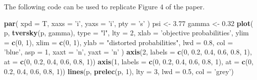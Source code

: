 \documentclass[
]{article}
\newenvironment{Shaded}{\begin{snugshade}}{\end{snugshade}}
\newcommand{\DataTypeTok}[1]{\textcolor[rgb]{0.13,0.29,0.53}{#1}}
\newcommand{\DecValTok}[1]{\textcolor[rgb]{0.00,0.00,0.81}{#1}}
\newcommand{\FloatTok}[1]{\textcolor[rgb]{0.00,0.00,0.81}{#1}}
\newcommand{\KeywordTok}[1]{\textcolor[rgb]{0.13,0.29,0.53}{\textbf{#1}}}
\newcommand{\NormalTok}[1]{#1}
\newcommand{\StringTok}[1]{\textcolor[rgb]{0.31,0.60,0.02}{#1}}
\begin{document}
The following code can be used to replicate Figure 4 of the paper.

\begin{Shaded}
\begin{Highlighting}[]
\KeywordTok{par}\NormalTok{(}
  \DataTypeTok{xpd =}\NormalTok{ T,}
  \DataTypeTok{xaxs =} \StringTok{'i'}\NormalTok{,}
  \DataTypeTok{yaxs =} \StringTok{'i'}\NormalTok{,}
  \DataTypeTok{pty =} \StringTok{'s'}
\NormalTok{)}
\NormalTok{psi <-}\StringTok{ }\FloatTok{3.77}
\NormalTok{gamma <-}\StringTok{ }\FloatTok{0.32}
\KeywordTok{plot}\NormalTok{(}
\NormalTok{  p,}
  \KeywordTok{tversky}\NormalTok{(p, gamma),}
  \DataTypeTok{type =} \StringTok{"l"}\NormalTok{,}
  \DataTypeTok{lty =} \DecValTok{2}\NormalTok{,}
  \DataTypeTok{xlab =} \StringTok{'objective probabilities'}\NormalTok{,}
  \DataTypeTok{ylim =} \KeywordTok{c}\NormalTok{(}\DecValTok{0}\NormalTok{, }\DecValTok{1}\NormalTok{),}
  \DataTypeTok{xlim =} \KeywordTok{c}\NormalTok{(}\DecValTok{0}\NormalTok{, }\DecValTok{1}\NormalTok{),}
  \DataTypeTok{ylab =} \StringTok{"distorted probabilities"}\NormalTok{,}
  \DataTypeTok{lwd =} \FloatTok{0.8}\NormalTok{,}
  \DataTypeTok{col =} \StringTok{'blue'}\NormalTok{,}
  \DataTypeTok{asp =} \DecValTok{1}\NormalTok{,}
  \DataTypeTok{xaxt =} \StringTok{'n'}\NormalTok{,}
  \DataTypeTok{yaxt =} \StringTok{'n'}
\NormalTok{)}
\KeywordTok{axis}\NormalTok{(}\DecValTok{2}\NormalTok{,}
     \DataTypeTok{labels =} \KeywordTok{c}\NormalTok{(}\DecValTok{0}\NormalTok{, }\FloatTok{0.2}\NormalTok{, }\FloatTok{0.4}\NormalTok{, }\FloatTok{0.6}\NormalTok{, }\FloatTok{0.8}\NormalTok{, }\DecValTok{1}\NormalTok{),}
     \DataTypeTok{at =} \KeywordTok{c}\NormalTok{(}\DecValTok{0}\NormalTok{, }\FloatTok{0.2}\NormalTok{, }\FloatTok{0.4}\NormalTok{, }\FloatTok{0.6}\NormalTok{, }\FloatTok{0.8}\NormalTok{, }\DecValTok{1}\NormalTok{))}
\KeywordTok{axis}\NormalTok{(}\DecValTok{1}\NormalTok{,}
     \DataTypeTok{labels =} \KeywordTok{c}\NormalTok{(}\DecValTok{0}\NormalTok{, }\FloatTok{0.2}\NormalTok{, }\FloatTok{0.4}\NormalTok{, }\FloatTok{0.6}\NormalTok{, }\FloatTok{0.8}\NormalTok{, }\DecValTok{1}\NormalTok{),}
     \DataTypeTok{at =} \KeywordTok{c}\NormalTok{(}\DecValTok{0}\NormalTok{, }\FloatTok{0.2}\NormalTok{, }\FloatTok{0.4}\NormalTok{, }\FloatTok{0.6}\NormalTok{, }\FloatTok{0.8}\NormalTok{, }\DecValTok{1}\NormalTok{))}
\KeywordTok{lines}\NormalTok{(p,}
      \KeywordTok{prelec}\NormalTok{(p, }\DecValTok{1}\NormalTok{),}
      \DataTypeTok{lty =} \DecValTok{3}\NormalTok{,}
      \DataTypeTok{lwd =} \FloatTok{0.5}\NormalTok{,}
      \DataTypeTok{col =} \StringTok{'grey'}\NormalTok{)}

\end{Highlighting}
\end{Shaded}
\end{document}
